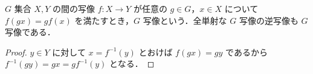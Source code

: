 \begin{defn}[作用を保存する写像]
$G$ 集合 $X,Y$ の間の写像 $f:X\to Y$ が任意の $g\in G$，$x\in X$ について $f(gx)=gf(x)$ を満たすとき，$G$ 写像という．全単射な $G$ 写像の逆写像も $G$ 写像である．
\end{defn}
\begin{proof}
$y\in Y$ に対して $x=f^{-1}(y)$ とおけば $f(gx)=gy$ であるから $f^{-1}(gy)=gx=gf^{-1}(y)$ となる．
\end{proof}

